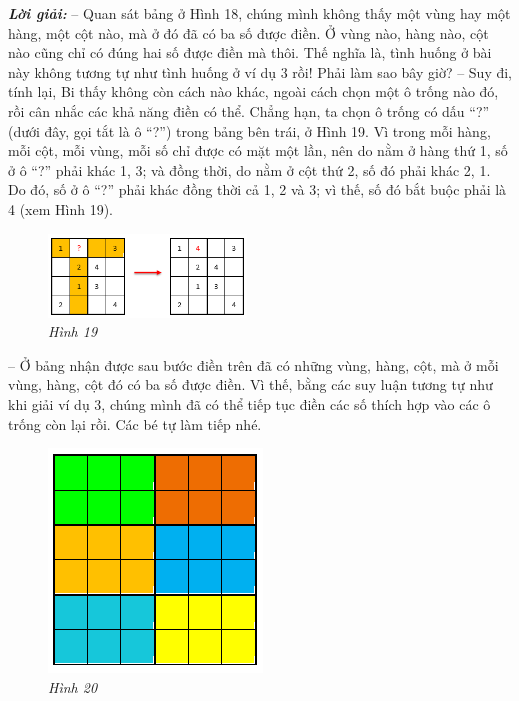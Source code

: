 	\textbf{\textit{Lời giải:}}
	\vskip 0.1cm
	-- Quan sát bảng ở Hình 18, chúng mình không thấy một vùng hay một hàng, một cột nào, mà ở đó đã có ba số được điền. Ở vùng nào, hàng nào, cột nào cũng chỉ có đúng hai số được điền mà thôi. Thế nghĩa là, tình huống ở bài này không tương tự như tình huống ở ví dụ $3$ rồi! Phải làm sao bây giờ?
	\vskip 0.2cm
	-- Suy đi, tính lại, Bi thấy không còn cách nào khác, ngoài cách chọn một ô trống nào đó, rồi cân nhắc các khả năng điền có thể. Chẳng hạn, ta chọn ô trống có dấu “?” (dưới đây, gọi tắt là ô “?”) trong bảng bên trái, ở Hình 19. Vì trong mỗi hàng, mỗi cột, mỗi vùng, mỗi số chỉ được có mặt một lần, nên do nằm ở hàng thứ 1, số ở ô “?” phải khác 1, 3; và đồng thời, do nằm ở cột thứ 2, số đó phải khác 2, 1. Do đó, số ở ô “?” phải khác đồng thời cả 1, 2 và 3; vì thế, số đó bắt buộc phải là 4 (xem Hình 19).
	\vskip 0.1cm
		\begin{figure}
			\centering
			\vspace*{-15pt}
			\captionsetup{labelformat= empty, justification=centering}
			\includegraphics[width=0.47\textwidth]{pic8}
			\vspace*{-5pt}
			\caption{\small\textit{Hình 19}}
			\vspace*{-10pt}
		\end{figure}
	-- Ở bảng nhận được sau bước điền trên đã có những vùng, hàng, cột, mà ở mỗi vùng, hàng, cột đó có ba số được điền. Vì thế, bằng các suy luận tương tự như khi giải ví dụ $3$, chúng mình đã có thể tiếp tục điền các số thích hợp vào các ô trống còn lại rồi. Các bé tự làm tiếp nhé.
	\vskip 0.1cm
	\begin{figure}
		\centering
		\vspace*{-30pt}
		\captionsetup{labelformat= empty, justification=centering}
		\includegraphics[scale=0.45]{pic9}
		\vspace*{-5pt}
		\caption{\small\textit{Hình 20}}
		\vspace*{-25pt}
	\end{figure}
